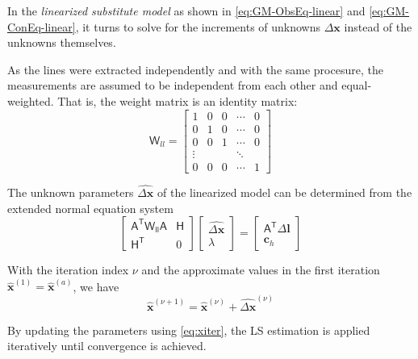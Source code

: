 In the \textit{linearized substitute model} as shown in \eqref{eq:GM-ObsEq-linear} and \eqref{eq:GM-ConEq-linear}, it turns to solve for the increments of unknowns $\Delta\boldsymbol x$ instead of the unknowns themselves.

As the lines were extracted independently and with the same procesure, the measurements are assumed to be independent from each other and equal-weighted. That is, the weight matrix is an identity matrix:
\begin{equation}
\mathsf{W}_{ll}=
\begin{bmatrix}
1&0&0&\cdots &0\\
0&1&0&\cdots &0\\
0&0&1&\cdots &0\\
\vdots&&&\ddots&\\
0&0&0&\cdots &1
\end{bmatrix}
\end{equation}




The unknown parameters $\widehat{\Delta\boldsymbol x}$ of the linearized model can be determined from the extended normal equation system
\begin{equation}
\begin{bmatrix}
\mathsf{A^T\mathsf{W}_{ll}A} & \mathsf{H}\\
\mathsf{H^T} & 0
\end{bmatrix}
\begin{bmatrix}
\widehat{\Delta\boldsymbol x}\\
\lambda
\end{bmatrix}
=
\begin{bmatrix}
\mathsf{A^T}\Delta\boldsymbol l\\
\boldsymbol c_h
\end{bmatrix}
\end{equation}

With the iteration index $\nu$ and the approximate values in the first iteration $\widehat{\boldsymbol x}^{(1)}=\widehat{\boldsymbol x}^{(a)}$, we have
\begin{equation}\label{eq:xiter}
	\widehat{\boldsymbol x}^{(\nu+1)}=
	\widehat{\boldsymbol x}^{(\nu)}+
	\widehat{\Delta\boldsymbol x}^{(\nu)}
\end{equation}

By updating the parameters using \cref{eq:xiter}, the LS estimation is applied iteratively until convergence is achieved. 


